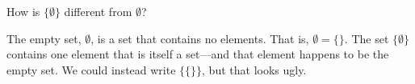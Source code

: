 \documentclass[nooutcomes]{ximera}
\begin{document}
\begin{problem}
How is $\{\emptyset\}$ different from $\emptyset$?  
\begin{freeResponse}
\begin{hint}
The empty set, $\emptyset$, is a set that contains no elements.  That is, $\emptyset = \{\}$.  The set $\{\emptyset\}$ contains one element that is itself a set---and that element happens to be the empty set.  We could instead write $\{\{\}\}$, but that looks ugly.
\end{hint}
\end{freeResponse}
\end{problem}
\end{document}
